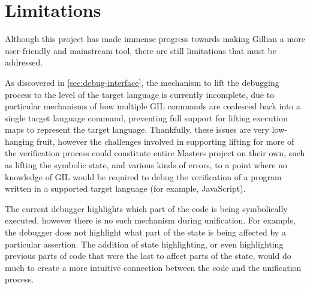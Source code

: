 
\section{Limitations}%
\label{sec:eval:limitations}

Although this project has made immense progress towards making Gillian a more
user-friendly and mainstream tool, there are still limitations that must be
addressed.

As discovered in \autoref{sec:debug-interface}, the mechanism to lift the
debugging process to the level of the target language is currently incomplete,
due to particular mechanisms of how multiple GIL commands are coalesced back
into a single target language command, preventing full support for lifting
execution maps to represent the target language.
Thankfully, these issues are very low-hanging fruit, however the challenges
involved in supporting lifting for more of the verification process could
constitute entire Masters project on their own, such as lifting the symbolic
state, and various kinds of errors, to a point where no knowledge of GIL would
be required to debug the verification of a program written in a supported target
language (for example, JavaScript).

The current debugger highlights which part of the code is being symbolically
executed, however there is no such mechanism during unification.
For example, the debugger does not highlight what part of the state is being
affected by a particular assertion. The addition of state highlighting, or even
highlighting previous parts of code that were the last to affect parts of the
state, would do much to create a more intuitive connection between the code and
the unification process.

